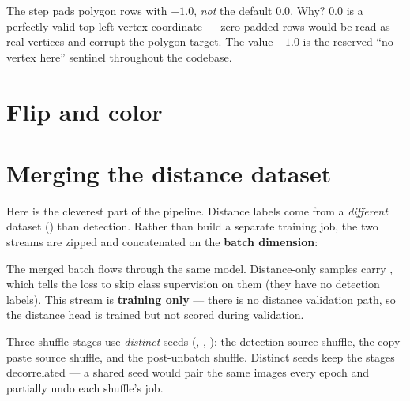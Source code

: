 \begin{pitfall}
The  step pads polygon rows with $-1.0$, \emph{not} the default
$0.0$. Why? $0.0$ is a perfectly valid top-left vertex coordinate --- zero-padded rows
would be read as real vertices and corrupt the polygon target. The value $-1.0$ is the
reserved ``no vertex here'' sentinel throughout the codebase.
\end{pitfall}

\section{Flip and color}

\section{Merging the distance dataset}
Here is the cleverest part of the pipeline. Distance labels come from a \emph{different}
dataset () than detection. Rather than build a separate training
job, the two streams are zipped and concatenated on the \textbf{batch dimension}:

\begin{center}
\end{center}

\noindent The merged batch flows through the same model. Distance-only samples carry
, which tells the loss to skip class supervision on them (they have no
detection labels). This stream is \textbf{training only} --- there is no distance
validation path, so the distance head is trained but not scored during validation.

\begin{hood}
Three shuffle stages use \emph{distinct} seeds (, ,
): the detection source shuffle, the copy-paste source shuffle, and the
post-unbatch shuffle. Distinct seeds keep the stages decorrelated --- a shared seed would
pair the same images every epoch and partially undo each shuffle's job.
\end{hood}
